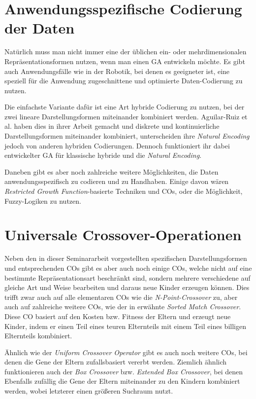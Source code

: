 \section{Anwendungsspezifische Codierung der Daten}
\label{sec:AnwSpezCod}

	Natürlich muss man nicht immer eine der üblichen ein- oder mehrdimensionalen Repräsentationsformen nutzen, wenn man einen GA entwickeln möchte. Es gibt auch Anwendungsfälle wie \zB in der Robotik, \cite{GABook} bei denen es geeigneter ist, eine speziell für die Anwendung zugeschnittene und optimierte Daten-Codierung zu nutzen.
	
	Die einfachste Variante dafür ist eine Art hybride Codierung zu nutzen, bei der zwei lineare Darstellungsformen miteinander kombiniert werden. Aguilar-Ruiz et al. haben dies in ihrer Arbeit \cite{NaturalCoding} gemacht und diskrete und kontinuierliche Darstellungsformen miteinander kombiniert, unterscheiden ihre \textit{Natural Encoding} jedoch von anderen hybriden Codierungen. Dennoch funktioniert ihr dabei entwickelter GA für klassische hybride und die \textit{Natural Encoding}.
	
	Daneben gibt es aber noch zahlreiche weitere Möglichkeiten, die Daten anwendungsspezifisch zu codieren und zu Handhaben. Einige davon wären \zB \textit{Restricted Growth Function}-basierte Techniken und COs, \cite{RestrictedGrowthFunction} oder die Mög\-lich\-keit, Fuzzy-Logiken zu nutzen. \cite{FuzzyEncoding}

\section{Universale Crossover-Operationen}
\label{sec:UnivOp}

	Neben den in dieser Seminararbeit vorgestellten spezifischen Darstellungsformen und entsprechenden COs gibt es aber auch noch einige COs, welche nicht auf eine bestimmte Repräsentationsart beschränkt sind, sondern mehrere verschiedene auf gleiche Art und Weise bearbeiten und daraus neue Kinder erzeugen können. Dies trifft zwar auch auf alle elementaren COs wie die \textit{N-Point-Crossover} zu, aber auch auf zahlreiche weitere COs, wie \zB der in \cite{COforPermutations} erwähnte \textit{Sorted Match Crossover}. Diese CO basiert auf den Kosten bzw. Fitness der Eltern und erzeugt neue Kinder, indem er einen Teil eines teuren Elternteils mit einem Teil eines billigen Elternteils kombiniert.
	
	Ähnlich wie der \textit{Uniform Crossover Operator} gibt es auch noch weitere COs, bei denen die Gene der Eltern zufallsbasiert vererbt werden. Ziemlich ähnlich funktionieren auch der \textit{Box Crossover} bzw. \textit{Extended Box Crossover}, bei denen Ebenfalls zufällig die Gene der Eltern miteinander zu den Kindern kombiniert werden, wobei letzterer einen größeren Suchraum nutzt. \cite{BoxCrossover}
	

